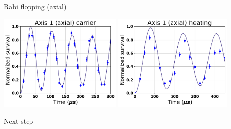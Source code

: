 \documentclass{beamer}
\begin{document}
\begin{frame}{Rabi flopping (axial)}
  \begin{center}
    \includegraphics[height=4.8cm]{../../experiments/rabi_flop/imgs/fit_20170409_a1_0_nol.png}
    \includegraphics[height=4.8cm]{../../experiments/rabi_flop/imgs/fit_20170409_a1_p1_nol.png}
  \end{center}
\end{frame}

\begin{frame}{Next step}
\end{frame}

\begin{frame}{}
\end{frame}
\end{document}
